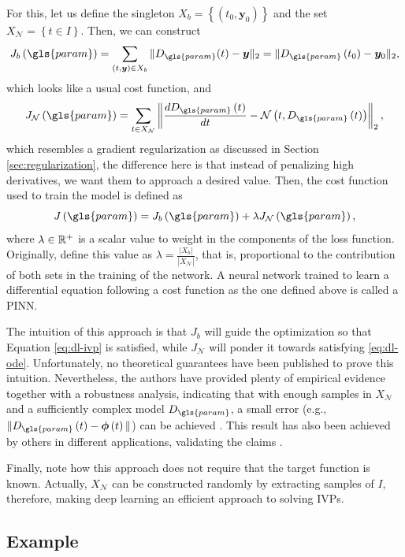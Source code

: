 For this, let us define the singleton $X_b=\left\{ \left( t_0,\bm{y}_0 \right)  \right\} $ and the set $X_{\mathcal{N}}=\left\{ t\in I \right\} $. Then, we can construct \[
    J_b\left( \gls{param} \right) = \sum_{\left( t,\bm{y} \right) \in X_b } \|D_{\gls{param}}(t) - \bm{y}\|_2 = \|D_{\gls{param}}\left( t_0 \right) -\bm{y}_0\|_2
,\] which looks like a usual cost function, and \[
J_{\mathcal{N}}\left( \gls{param} \right) = \sum_{t \in X_{\mathcal{N}}} \left\| \frac{d D_{\gls{param}}\left( t \right) }{dt} - \mathcal{N}\left( t,D_{\gls{param}}\left( t \right)  \right)  \right\|_2
,\] which resembles a gradient regularization as discussed in Section \ref{sec:regularization}, the difference here is that instead of penalizing high derivatives, we want them to approach a desired value.
Then, the cost function used to train the model is defined as \[
J\left( \gls{param} \right) = J_b\left( \gls{param} \right) + \lambda J_{\mathcal{N}}\left( \gls{param} \right) 
,\] where $\lambda \in \mathbb{R}^+$ is a scalar value to weight in the components of the loss function.
Originally, \textcite{Raissi2019} define this value as $\lambda = \frac{|X_{b}|}{|X_{\mathcal{N}}|}$, that is, proportional to the contribution of both sets in the training of the network.
A neural network trained to learn a differential equation following a cost function as the one defined above is called a \gls{PINN}.

The intuition of this approach is that $J_b$ will guide the optimization so that Equation \eqref{eq:dl-ivp} is satisfied, while  $J_{\mathcal{N}}$ will ponder it towards satisfying \eqref{eq:dl-ode}.
Unfortunately, no theoretical guarantees have been published to prove this intuition.
Nevertheless, the authors have provided plenty of empirical evidence together with a robustness analysis, indicating that with enough samples in $X_{\mathcal{N}}$ and a sufficiently complex model $D_{\gls{param}}$, a small error (e.g., $\|D_{\gls{param}}\left( t \right)-\bm{\phi}\left( t \right) \| $) can be achieved \cite{Raissi2019}.
This result has also been achieved by others in different applications, validating the claims \cite{noakoasteen_physics-informed_2020,zhang_physics-informed_2020,Arnold2021,Yucesan2022}.

Finally, note how this approach does not require that the target function is known.
Actually, $X_{\mathcal{N}}$ can be constructed randomly by extracting samples of $I$,
therefore, making deep learning an efficient approach to solving \gls{IVP}s.

\subsection*{Example}

